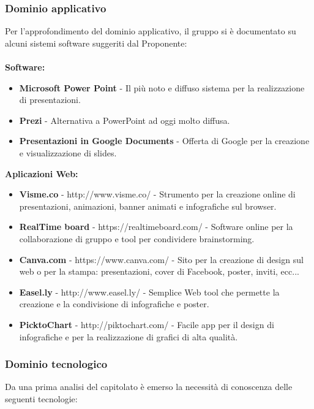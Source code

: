 \subsubsection{Dominio applicativo}
Per l’approfondimento del dominio applicativo, il gruppo si è documentato su alcuni sistemi software suggeriti dal Proponente:\\
\\
\textbf{Software:}
\begin{itemize}
	\item \textbf{Microsoft Power Point} - Il più noto e diffuso sistema per la realizzazione di presentazioni.
	\item \textbf{Prezi} - Alternativa a PowerPoint ad oggi molto diffusa.
	\item \textbf{Presentazioni in Google Documents} - Offerta di Google per la creazione e visualizzazione di slides.
\end{itemize}
\textbf{Aplicazioni Web:}
\begin{itemize}
	\item \textbf{Visme.co} - http://www.visme.co/ - Strumento per la creazione online di presentazioni, animazioni, banner animati e infografiche sul browser.
	\item \textbf{RealTime board} - https://realtimeboard.com/ - Software online per la collaborazione di gruppo e tool per condividere brainstorming.
	\item \textbf{Canva.com} - https://www.canva.com/ - Sito per la creazione di design sul web o per la stampa: presentazioni, cover di Facebook, poster, inviti, ecc...
	\item \textbf{Easel.ly} - http://www.easel.ly/ - Semplice Web tool che permette la creazione e la condivisione di infografiche e poster.
	\item \textbf{PicktoChart} - http://piktochart.com/ - Facile app per il design di infografiche e per la realizzazione di grafici di alta qualità.
\end{itemize}

\subsubsection{Dominio tecnologico}

Da una prima analisi del capitolato è emerso la necessità di conoscenza delle seguenti tecnologie:

